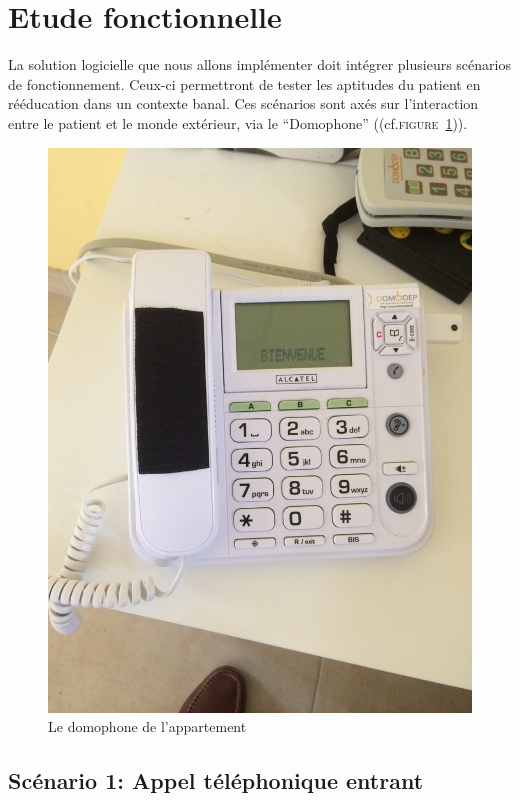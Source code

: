 \section{Etude fonctionnelle}

La solution logicielle que nous allons implémenter doit intégrer plusieurs scénarios de fonctionnement. Ceux-ci permettront de tester les aptitudes du patient en rééducation dans un contexte banal. Ces scénarios sont axés sur l'interaction entre le patient et le monde extérieur, via le \enquote{Domophone} ((cf.\textsc{figure~\ref{domo}})).

\begin{figure}
  \includegraphics[scale=0.15, bb = 0 50 960 1230]{1-PreEtude/img/domophone_photo}
  \caption{Le domophone de l'appartement}
  \label{domo}
\end{figure}

\subsection{Scénario 1: Appel téléphonique entrant}

